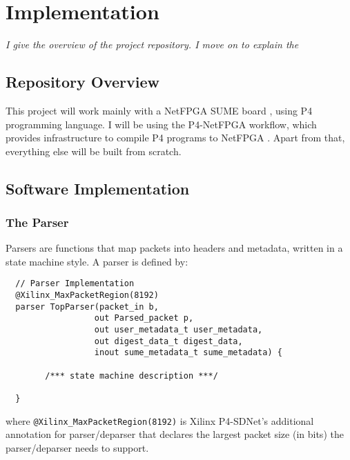 \chapter{Implementation}
\textit{I give the overview of the project repository. I move on to explain the  }

\section{Repository Overview}



This project will work mainly with a NetFPGA SUME board \cite{zilberman2014netfpga}, using P4 programming language. I will be using the P4-NetFPGA workflow, which provides infrastructure to compile P4 programs to NetFPGA \cite{fpga}. Apart from that, everything else will be built from scratch.

\section{Software Implementation}
	\subsection{The Parser}
Parsers are functions that map packets into headers and metadata, written in a state machine style. A parser is defined by:

{\renewcommand{\baselinestretch}{0.8}\small
	\begin{verbatim}
  // Parser Implementation
  @Xilinx_MaxPacketRegion(8192)
  parser TopParser(packet_in b, 
                  out Parsed_packet p, 
                  out user_metadata_t user_metadata,
                  out digest_data_t digest_data,
                  inout sume_metadata_t sume_metadata) {
                  
        /*** state machine description ***/
        
  }
	\end{verbatim}
}
where \texttt{@Xilinx\_MaxPacketRegion(8192)} is Xilinx P4-SDNet's additional annotation for parser/deparser that declares the largest packet size (in bits) the parser/deparser needs to support.

